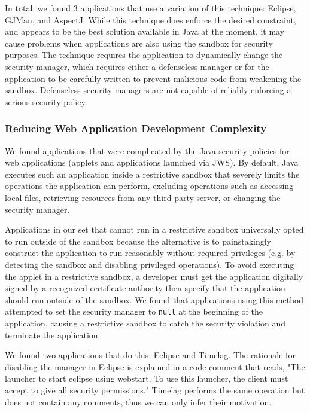 \documentclass{sig-alternate}
\begin{document}
In total, we found 3 applications that use a variation of this technique:
Eclipse, GJMan, and AspectJ. While this technique does enforce the
desired constraint, and appears to be the best solution available
in Java at the moment, it may cause problems when applications are
also using the sandbox for security purposes. The technique requires
the application to dynamically change the security manager, which requires either a defenseless manager or for the application
to be carefully written to prevent malicious code from weakening the sandbox. Defenseless security managers
are not capable of reliably enforcing a serious security policy.

\subsubsection{Reducing Web Application Development Complexity}\label{sub:Reducing-Web-Application-Complexity}

We found applications that were complicated by the Java security policies
for web applications (applets and applications launched via JWS). By default, Java executes such an application inside a restrictive
sandbox that severely limits the operations the application can perform,
excluding operations such as accessing local files, retrieving resources
from any third party server, or changing the security manager. 

Applications in our set that cannot run in a restrictive sandbox universally opted to run outside of the sandbox because the alternative is to painstakingly construct the application to run reasonably without required privileges (e.g. by detecting the sandbox and disabling privileged operations). To avoid executing the applet in a restrictive
sandbox, a developer must get the application digitally signed
by a recognized certificate authority then specify that the application should
run outside of the sandbox. We found that applications using this method attempted
to set the security manager to \texttt{null} at the beginning of the
application, causing a restrictive sandbox to catch the security violation and
terminate the application.

We found two applications that do this: Eclipse and
Timelag. The rationale for disabling the manager in Eclipse is explained in a code comment that reads, "The launcher to start eclipse using webstart. To use this launcher, the client must accept to give all security permissions." Timelag performs the same operation but does not contain any comments, thus we can only infer their motivation.
\end{document}
